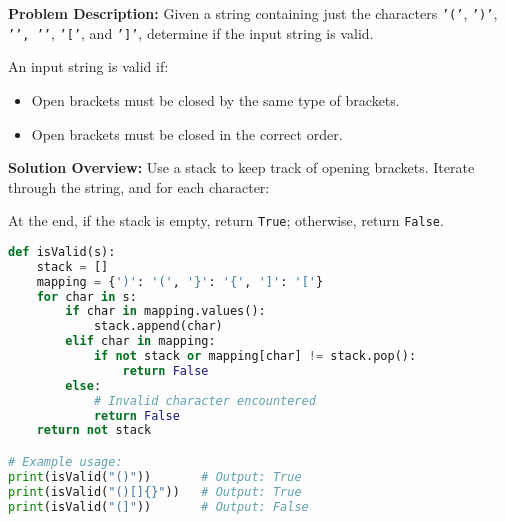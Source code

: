 

\textbf{Problem Description:}  
Given a string containing just the characters \texttt{'('}, \texttt{')'}, \texttt{'{'}, \texttt{'}'}, \texttt{'['}, and \texttt{']'}, determine if the input string is valid.

An input string is valid if:
\begin{itemize}
    \item Open brackets must be closed by the same type of brackets.
    \item Open brackets must be closed in the correct order.
\end{itemize}

\textbf{Solution Overview:}  
Use a stack to keep track of opening brackets. Iterate through the string, and for each character:
At the end, if the stack is empty, return \texttt{True}; otherwise, return \texttt{False}.

\begin{fullwidth}
\begin{lstlisting}[language=Python]
def isValid(s):
    stack = []
    mapping = {')': '(', '}': '{', ']': '['}
    for char in s:
        if char in mapping.values():
            stack.append(char)
        elif char in mapping:
            if not stack or mapping[char] != stack.pop():
                return False
        else:
            # Invalid character encountered
            return False
    return not stack

# Example usage:
print(isValid("()"))       # Output: True
print(isValid("()[]{}"))   # Output: True
print(isValid("(]"))       # Output: False
\end{lstlisting}
\end{fullwidth}